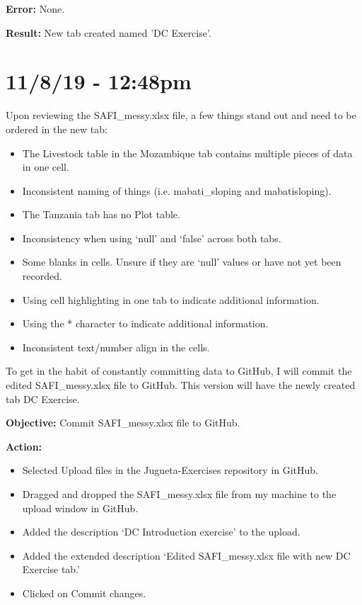 \documentclass{article}
\begin{document}
\textbf{Error:} None.

\textbf{Result:} New tab created named 'DC Exercise'.

\section*{11/8/19 - 12:48pm}

Upon reviewing the SAFI\_messy.xlsx file, a few things stand out and need to be ordered in the new tab:

\begin{itemize}
    \item The Livestock table in the Mozambique tab contains multiple pieces of data in one cell.
    \item Inconsistent naming of things (i.e. mabati\_sloping and mabatisloping).
    \item The Tanzania tab has no Plot table.
    \item Inconsistency when using ‘null’ and ‘false’ across both tabs.
    \item Some blanks in cells. Unsure if they are ‘null’ values or have not yet been recorded.
    \item Using cell highlighting in one tab to indicate additional information.
    \item Using the * character to indicate additional information.
    \item Inconsistent text/number align in the cells.
\end{itemize}

To get in the habit of constantly committing data to GitHub, I will commit the edited SAFI\_messy.xlsx file to GitHub. This version will have the newly created tab DC Exercise.

\textbf{Objective:} Commit SAFI\_messy.xlsx file to GitHub.

\textbf{Action:}
\begin{itemize}
    \item Selected Upload files in the Jugueta-Exercises repository in GitHub.
    \item Dragged and dropped the SAFI\_messy.xlsx file from my machine to the upload window in GitHub.
    \item Added the description ‘DC Introduction exercise’ to the upload.
    \item Added the extended description ‘Edited SAFI\_messy.xlsx file with new DC Exercise tab.’
    \item Clicked on Commit changes.
\end{itemize}
\end{document}
